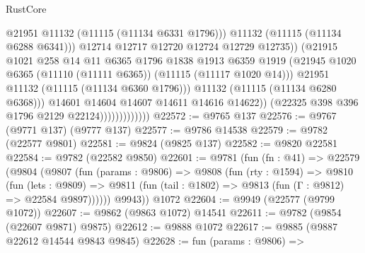 \begin{lexlean}{RustCore}
\begin{coremodule}
                                          @21951
                                          @11132
                                          (@11115 (@11134 @6331 @1796)))
                                        @11132
                                        (@11115 (@11134 @6288 @6341)))
                                      @12714
                                      @12717
                                      @12720
                                      @12724
                                      @12729
                                      @12735))
                                  (@21915
                                    @1021
                                    @258
                                    @14
                                    @11
                                    @6365
                                    @1796
                                    @1838
                                    @1913
                                    @6359
                                    @1919
                                    (@21945
                                      @1020
                                      @6365
                                      (@11110 (@11111 @6365))
                                      (@11115 (@11117 @1020 @14)))
                                    @21951
                                    @11132
                                    (@11115 (@11134 @6360 @1796)))
                                  @11132
                                  (@11115 (@11134 @6280 @6368)))
                                @14601
                                @14604
                                @14607
                                @14611
                                @14616
                                @14622))
                            (@22325 @398 @396 @1796 @2129 @22124)))))))))))))
@22572 := @9765 @137
@22576 := @9767 (@9771 @137) (@9777 @137)
@22577 := @9786 @14538
@22579 := @9782 (@22577 @9801)
@22581 := @9824 (@9825 @137)
@22582 := @9820 @22581
@22584 := @9782 (@22582 @9850)
@22601 := @9781
    (fun (fn : @41) =>
    @22579
      (@9804
        (@9807
          (fun (params : @9806) =>
          @9808
            (fun (rty : @1594) =>
            @9810
              (fun (lets : @9809) =>
              @9811 (fun (tail : @1802) => @9813 (fun (Γ : @9812) => @22584 @9897))))))
        @9943))
    @1072
@22604 := @9949 (@22577 (@9799 @1072))
@22607 := @9862 (@9863 @1072) @14541
@22611 := @9782 (@9854 (@22607 @9871) @9875)
@22612 := @9888 @1072
@22617 := @9885 (@9887 @22612 @14544 @9843 @9845)
@22628 := fun (params : @9806) =>

\end{coremodule}
\end{lexlean}
